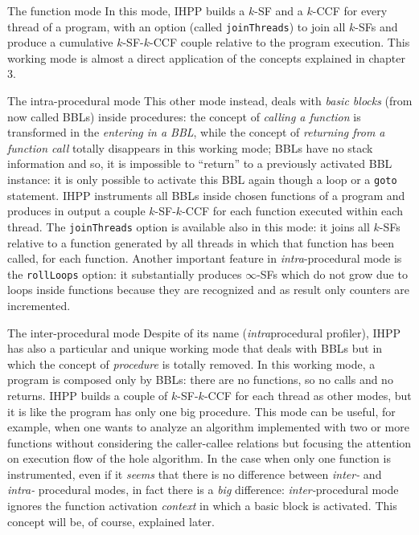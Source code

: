 \documentclass[a4paper,11pt]{report}
\begin{document}
\begin{paragraph}{The function mode}
In this mode, IHPP builds a $k$-SF and a $k$-CCF for every thread of a program,
with an option (called \verb|joinThreads|) to join all $k$-SFs and produce a cumulative $k$-SF-$k$-CCF couple relative to the program execution.
This working mode is almost a direct application of the concepts explained in chapter 3. 
\end{paragraph}

\begin{paragraph}{The intra-procedural mode}
This other mode instead, deals with \emph{basic blocks} (from now called BBLs) inside procedures: the concept of \emph{calling a function} is transformed in the \emph{entering in a BBL}, while the concept of \emph{returning from a function call} totally disappears in this working mode; BBLs have no stack information and so, it is impossible to ``return'' to a previously activated BBL instance: it is only possible to activate this BBL again though a loop or a \verb|goto| statement.
IHPP instruments all BBLs inside chosen functions of a program and produces in output a couple $k$-SF-$k$-CCF for each function executed within each thread. The \verb|joinThreads| option is available also in this mode: it joins all $k$-SFs relative to a function generated by all threads in which that function has been called, for each function.
Another important feature in \emph{intra}-procedural mode is the \verb|rollLoops| option: it substantially produces $\infty$-SFs which do not grow due to loops inside functions because they are recognized and as result only counters are incremented. 
\end{paragraph}

\begin{paragraph}{The inter-procedural mode}
Despite of its name (\emph{intra}procedural profiler), IHPP has also a particular and unique working mode that deals with BBLs but in which the concept of \emph{procedure} is totally removed. In this working mode, a program is composed only by BBLs: there are no functions, so no calls and no returns. IHPP builds a couple of $k$-SF-$k$-CCF for each thread as other modes, but it is like the program has only one big procedure. This mode can be useful, for example, when one wants to analyze an algorithm implemented with two or more functions without considering the caller-callee relations but focusing the attention on execution flow of the hole algorithm. In the case when only one function is instrumented, even if it \emph{seems} that there is no difference between \emph{inter-} and \emph{intra-} procedural modes, in fact there is a \emph{big} difference: \emph{inter-}procedural mode ignores 
the function activation \emph{context} in which a basic block is activated. 
This concept will be, of course, explained later.
\end{paragraph}
\end{document}
